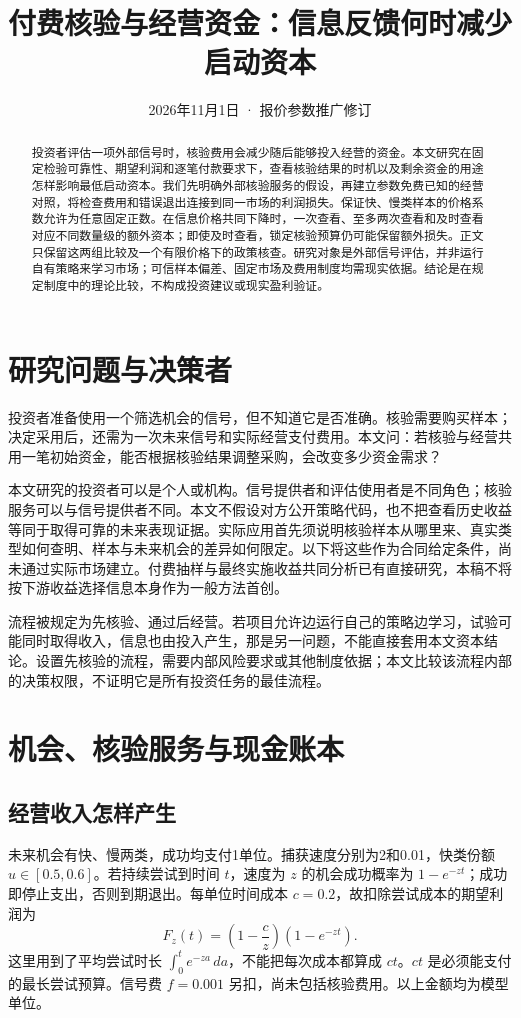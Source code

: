\documentclass[UTF8,fontset=windows,11pt,a4paper]{ctexart}
\numberwithin{equation}{section}
\begin{document}
\title{付费核验与经营资金：信息反馈何时减少启动资本}
\author{}\date{2026年11月1日 · 报价参数推广修订}
\maketitle
\begin{abstract}
投资者评估一项外部信号时，核验费用会减少随后能够投入经营的资金。本文研究在固定检验可靠性、期望利润和逐笔付款要求下，查看核验结果的时机以及剩余资金的用途怎样影响最低启动资本。我们先明确外部核验服务的假设，再建立参数免费已知的经营对照，将检查费用和错误退出连接到同一市场的利润损失。保证快、慢类样本的价格系数允许为任意固定正数。在信息价格共同下降时，一次查看、至多两次查看和及时查看对应不同数量级的额外资本；即使及时查看，锁定核验预算仍可能保留额外损失。正文只保留这两组比较及一个有限价格下的政策核查。研究对象是外部信号评估，并非运行自有策略来学习市场；可信样本偏差、固定市场及费用制度均需现实依据。结论是在规定制度中的理论比较，不构成投资建议或现实盈利验证。
\end{abstract}

\section{研究问题与决策者}
投资者准备使用一个筛选机会的信号，但不知道它是否准确。核验需要购买样本；决定采用后，还需为一次未来信号和实际经营支付费用。本文问：若核验与经营共用一笔初始资金，能否根据核验结果调整采购，会改变多少资金需求？

本文研究的投资者可以是个人或机构。信号提供者和评估使用者是不同角色；核验服务可以与信号提供者不同。本文不假设对方公开策略代码，也不把查看历史收益等同于取得可靠的未来表现证据。实际应用首先须说明核验样本从哪里来、真实类型如何查明、样本与未来机会的差异如何限定。以下将这些作为合同给定条件，尚未通过实际市场建立。付费抽样与最终实施收益共同分析已有直接研究\cite{wald}，本稿不将按下游收益选择信息本身作为一般方法首创。

流程被规定为先核验、通过后经营。若项目允许边运行自己的策略边学习，试验可能同时取得收入，信息也由投入产生，那是另一问题，不能直接套用本文资本结论。设置先核验的流程，需要内部风险要求或其他制度依据；本文比较该流程内部的决策权限，不证明它是所有投资任务的最佳流程。

\section{机会、核验服务与现金账本}
\subsection{经营收入怎样产生}
未来机会有快、慢两类，成功均支付1单位。捕获速度分别为2和0.01，快类份额 $u\in[0.5,0.6]$。若持续尝试到时间 $t$，速度为 $z$ 的机会成功概率为 $1-e^{-zt}$；成功即停止支出，否则到期退出。每单位时间成本 $c=0.2$，故扣除尝试成本的期望利润为
\begin{equation}
 F_z(t)=\left(1-\frac c z\right)(1-e^{-zt}).
\end{equation}
这里用到了平均尝试时长 $\int_0^t e^{-za}\,da$，不能把每次成本都算成 $ct$。$ct$ 是必须能支付的最长尝试预算。信号费 $f=0.001$ 另扣，尚未包括核验费用。以上金额均为模型单位。
\end{document}
